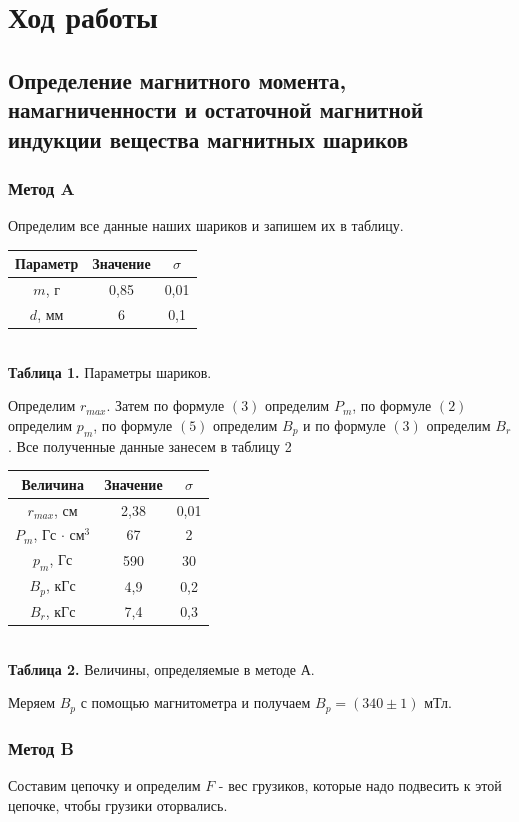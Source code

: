 \documentclass[a4paper, 12pt]{article}%
\begin{document}
\section*{Ход работы}
\subsection*{Определение магнитного момента, намагниченности и остаточной магнитной индукции вещества магнитных шариков}
\subsubsection*{Метод A}
Определим все данные наших шариков и запишем их в таблицу.\\
\begin{center}
\begin{tabular}{|c|c|c|}
\hline
Параметр & Значение & $\sigma$ \\ \hline
$m$, г & 0,85 & 0,01 \\ \hline
$d$, мм & 6 & 0,1 \\ \hline
\end{tabular}\\
\textbf{Таблица 1.} Параметры шариков.
\end{center}
Определим $r_{max}$. Затем по формуле $(3)$ определим $P_m$, по формуле $(2)$ определим $p_m$, по формуле $(5)$ определим $B_p$ и по формуле $(3)$ определим $B_r$. Все полученные данные занесем в таблицу 2
\begin{center}
\begin{tabular}{|c|c|c|}
\hline
Величина & Значение & $\sigma$ \\ \hline
$r_{max}$, см & 2,38 & 0,01 \\ \hline
$P_m$, Гс $\cdot$ см$^3$ & 67 & 2 \\ \hline
$p_m$, Гс & 590 & 30 \\ \hline
$B_p$, кГс & 4,9 & 0,2 \\ \hline
$B_r$, кГс & 7,4 & 0,3 \\ \hline
\end{tabular}\\
\textbf{Таблица 2.} Величины, определяемые в методе А.
\end{center}
Меряем $B_p$ с помощью магнитометра и получаем $B_p = (340 \pm 1)$ мТл.
\subsubsection*{Метод B}
Составим цепочку и определим $F$ - вес грузиков, которые надо подвесить к этой цепочке, чтобы грузики оторвались. 
\end{document}
